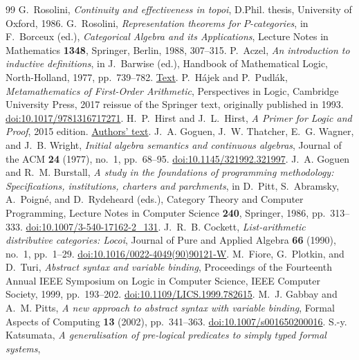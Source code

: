 \documentclass[11pt]{article}
\theoremstyle{definition}\newtheorem{definition}[theorem]{Definition}
\begin{document}
\begin{thebibliography}{99}
G.~Rosolini, \emph{Continuity and effectiveness in topoi}, D.Phil.
thesis, University of Oxford, 1986.
G.~Rosolini, \emph{Representation theorems for $P$-categories},
in F.~Borceux (ed.), \emph{Categorical Algebra and its Applications},
Lecture Notes in Mathematics \textbf{1348}, Springer, Berlin, 1988,
307--315.
P.~Aczel, \emph{An introduction to inductive definitions},
in J.~Barwise (ed.), Handbook of Mathematical Logic,
North-Holland, 1977, pp.~739--782.
\href{https://lawrencecpaulson.github.io/papers/Aczel-Inductive-Defs.pdf}{Text}.
P.~H\'ajek and P.~Pudl\'ak, \emph{Metamathematics of First-Order
Arithmetic}, Perspectives in Logic, Cambridge University Press,
2017 reissue of the Springer text, originally published in 1993.
\href{https://doi.org/10.1017/9781316717271}{doi:10.1017/9781316717271}.
H.~P.~Hirst and J.~L.~Hirst, \emph{A Primer for Logic and Proof},
2015 edition.
\href{https://www.appstate.edu/~hirstjl/primer/hirst.pdf}{Authors' text}.
J.~A. Goguen, J.~W. Thatcher, E.~G. Wagner, and J.~B. Wright,
\emph{Initial algebra semantics and continuous algebras},
Journal of the ACM \textbf{24} (1977), no.~1, pp.~68--95.
\href{https://doi.org/10.1145/321992.321997}{doi:10.1145/321992.321997}.
J.~A. Goguen and R.~M. Burstall,
\emph{A study in the foundations of programming methodology:
Specifications, institutions, charters and parchments},
in D.~Pitt, S.~Abramsky, A.~Poign\'e, and D.~Rydeheard (eds.),
Category Theory and Computer Programming, Lecture Notes in Computer
Science \textbf{240}, Springer, 1986, pp.~313--333.
\href{https://doi.org/10.1007/3-540-17162-2_131}{doi:10.1007/3-540-17162-2\_131}.
J.~R.~B. Cockett, \emph{List-arithmetic distributive categories: Locoi},
Journal of Pure and Applied Algebra \textbf{66} (1990), no.~1, pp.~1--29.
\href{https://doi.org/10.1016/0022-4049(90)90121-W}{doi:10.1016/0022-4049(90)90121-W}.
M.~Fiore, G.~Plotkin, and D.~Turi,
\emph{Abstract syntax and variable binding},
Proceedings of the Fourteenth Annual IEEE Symposium on Logic in
Computer Science, IEEE Computer Society, 1999, pp.~193--202.
\href{https://doi.org/10.1109/LICS.1999.782615}{doi:10.1109/LICS.1999.782615}.
M.~J. Gabbay and A.~M. Pitts,
\emph{A new approach to abstract syntax with variable binding},
Formal Aspects of Computing \textbf{13} (2002), pp.~341--363.
\href{https://doi.org/10.1007/s001650200016}{doi:10.1007/s001650200016}.
S.-y. Katsumata,
\emph{A generalisation of pre-logical predicates to simply typed formal systems},

\end{thebibliography}
\end{document}
